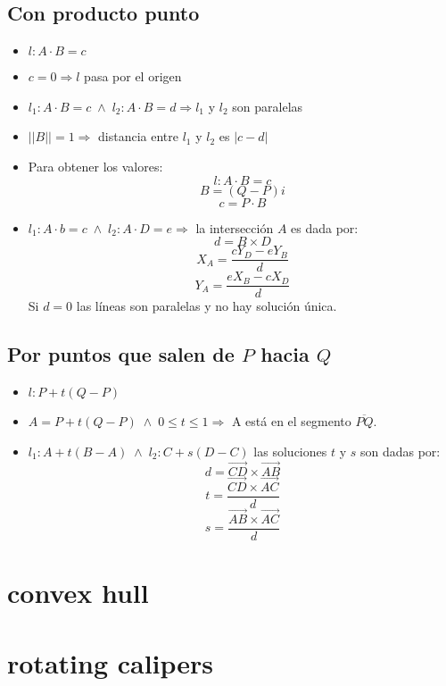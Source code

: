 \subsection{Con producto punto}
\begin{itemize}
\item $l: A \cdot B = c$
\item $c = 0 \Rightarrow l$ pasa por el origen
\item $l_1: A \cdot B = c \;\land\; l_2: A \cdot B = d \Rightarrow l_1$ y $l_2$ son paralelas
\item $||B|| = 1 \Rightarrow $ distancia entre $l_1$ y $l_2$ es $|c-d|$
\item Para obtener los valores: $$l: A\cdot B = c$$ $$B = (Q-P)i$$ $$c = P\cdot B$$ 
\item $l_1: A\cdot b = c \; \land \; l_2: A\cdot D = e \Rightarrow$ la intersecci\'on $A$ es dada por:
	$$d = B\times D$$ $$X_A = \frac{cY_D-eY_B}{d}$$ $$Y_A = \frac{eX_B-cX_D}{d}$$
	Si $d = 0$ las l\'ineas son paralelas y no hay soluci\'on \'unica. 
\end{itemize}

\subsection{Por puntos que salen de $P$ hacia $Q$}
\begin{itemize}
\item $l:P+t(Q-P)$
\item $A = P+t(Q-P) \;\land\; 0 \leq t \leq 1 \Rightarrow$ A est\'a en el segmento $\overline{PQ}$.
\item $l_1: A+t(B-A) \;\land\; l_2:C+s(D-C)$ las soluciones $t$ y $s$ son dadas por:
	$$d = \overrightarrow{CD}\times\overrightarrow{AB} $$ $$t = \frac{\overrightarrow{CD}\times\overrightarrow{AC}}{d}$$
	$$s = \frac{\overrightarrow{AB}\times\overrightarrow{AC}}{d}$$
\end{itemize}

\section{convex hull}

\section{rotating calipers}

